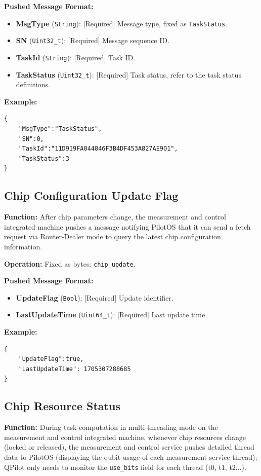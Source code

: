 \documentclass[12pt, a4paper]{article}
\begin{document}
\textbf{Pushed Message Format:}
\begin{itemize}
    \item \textbf{MsgType} (\texttt{String}): [Required] Message type, fixed as \texttt{TaskStatus}.
    \item \textbf{SN} (\texttt{Uint32\_t}): [Required] Message sequence ID.
    \item \textbf{TaskId} (\texttt{String}): [Required] Task ID.
    \item \textbf{TaskStatus} (\texttt{Uint32\_t}): [Required] Task status, refer to the task status definitions.
\end{itemize}

\noindent \textbf{Example:}
\begin{lstlisting}
{
    "MsgType":"TaskStatus",
    "SN":0,
   	"TaskId":"11D919FA044846F3B4DF453A827AE901",
    "TaskStatus":3
}
\end{lstlisting}

\subsection{Chip Configuration Update Flag}

\textbf{Function:} After chip parameters change, the measurement and control integrated machine pushes a message notifying PilotOS that it can send a fetch request via Router-Dealer mode to query the latest chip configuration information.

\textbf{Operation:} Fixed as bytes: \texttt{chip\_update}.

\textbf{Pushed Message Format:}
\begin{itemize}
    \item \textbf{UpdateFlag} (\texttt{Bool}): [Required] Update identifier.
    \item \textbf{LastUpdateTime} (\texttt{Uint64\_t}): [Required] Last update time.
\end{itemize}

\noindent \textbf{Example:}
\begin{lstlisting}
{
    "UpdateFlag":true,
    "LastUpdateTime": 1705307288685
}
\end{lstlisting}

\subsection{Chip Resource Status}

\textbf{Function:} During task computation in multi-threading mode on the measurement and control integrated machine, whenever chip resources change (locked or released), the measurement and control service pushes detailed thread data to PilotOS (displaying the qubit usage of each measurement service thread); QPilot only needs to monitor the \texttt{use\_bits} field for each thread (t0, t1, t2...).
\end{document}
